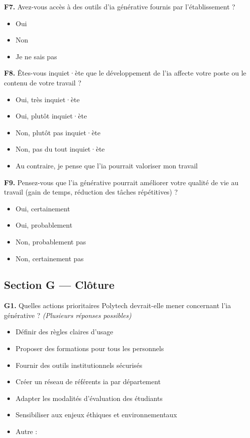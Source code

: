 \textbf{F7.} Avez-vous accès à des outils d'\gls{ia} générative fournis
par l'établissement ?
\begin{itemize}[label=$\square$, leftmargin=1.5cm]
  \item Oui
  \item Non
  \item Je ne sais pas
\end{itemize}
 
\textbf{F8.} Êtes-vous inquiet·ète que le développement de l'\gls{ia}
affecte votre poste ou le contenu de votre travail ?
\begin{itemize}[label=$\square$, leftmargin=1.5cm]
  \item Oui, très inquiet·ète
  \item Oui, plutôt inquiet·ète
  \item Non, plutôt pas inquiet·ète
  \item Non, pas du tout inquiet·ète
  \item Au contraire, je pense que l'\gls{ia} pourrait valoriser mon
        travail
\end{itemize}
 
\textbf{F9.} Pensez-vous que l'\gls{ia} générative pourrait améliorer
votre qualité de vie au travail (gain de temps, réduction des tâches
répétitives) ?
\begin{itemize}[label=$\square$, leftmargin=1.5cm]
  \item Oui, certainement
  \item Oui, probablement
  \item Non, probablement pas
  \item Non, certainement pas
\end{itemize}

\medskip

\subsection{Section G — Clôture}

\textbf{G1.} Quelles actions prioritaires Polytech devrait-elle mener concernant l'\gls{ia} générative ? \textit{(Plusieurs réponses possibles)}
\begin{itemize}[label=$\square$, leftmargin=1.5cm]
  \item Définir des règles claires d'usage
  \item Proposer des formations pour tous les personnels
  \item Fournir des outils institutionnels sécurisés
  \item Créer un réseau de référents \gls{ia} par département
  \item Adapter les modalités d'évaluation des étudiants
  \item Sensibiliser aux enjeux éthiques et environnementaux
  \item Autre : \underline{\hspace{4cm}}
\end{itemize}

